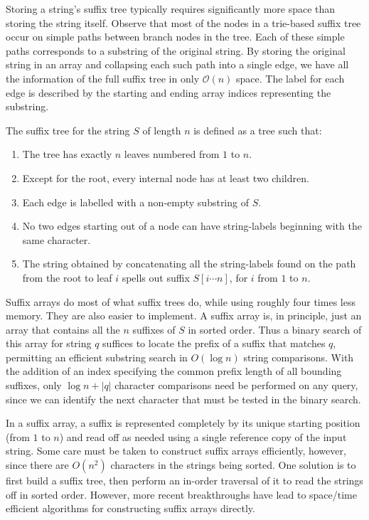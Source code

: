 \documentclass{article}
\newcommand{\bigO}{\mathcal{O}}
\begin{document}
    Storing a string's suffix tree typically requires significantly more space than storing the string itself. Observe that most of the nodes in a trie-based suffix tree occur on simple paths between branch nodes in the tree. Each of these simple paths corresponds to a substring of the original string. By storing the original string in an array and collapsing each such path into a single edge, we have all the information of the full suffix tree in only $\bigO(n)$ space. The label for each edge is described by the starting and ending array indices representing the substring. 
    
    The suffix tree for the string $S$ of length $n$ is defined as a tree such that:
    \begin{enumerate}
        \item The tree has exactly $n$ leaves numbered from $1$ to $n$.
        \item Except for the root, every internal node has at least two children.
        \item Each edge is labelled with a non-empty substring of $S$.
        \item No two edges starting out of a node can have string-labels beginning with the same character.
        \item The string obtained by concatenating all the string-labels found on the path from the root to leaf $i$ spells out suffix $S[i \cdots n]$, for $i$ from $1$ to $n$.
    \end{enumerate}
    Suffix arrays do most of what suffix trees do, while using roughly four times less memory. They are also easier to implement. A suffix array is, in principle, just an array that contains all the $n$ suffixes of $S$ in sorted order. Thus a binary search of this array for string $q$ suffices to locate the prefix of a suffix that matches $q$, permitting an efficient substring search in $O(\log n)$ string comparisons. With the addition of an index specifying the common prefix length of all bounding suffixes, only $\log n+|q|$ character comparisons need be performed on any query, since we can identify the next character that must be tested in the binary search.
    
    In a suffix array, a suffix is represented completely by its unique starting position (from $1$ to $n$) and read off as needed using a single reference copy of the input string. Some care must be taken to construct suffix arrays efficiently, however, since there are $O(n^2)$ characters in the strings being sorted. One solution is to first build a suffix tree, then perform an in-order traversal of it to read the strings off in sorted order. However, more recent breakthroughs have lead to space/time efficient algorithms for constructing suffix arrays directly.
\end{document}
